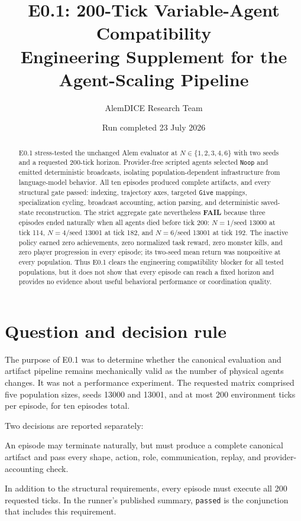 \documentclass[11pt]{article}
\title{\textbf{E0.1: 200-Tick Variable-Agent Compatibility}\\
\large Engineering Supplement for the Agent-Scaling Pipeline}
\author{AlemDICE Research Team}
\date{Run completed 23 July 2026}
\newcommand{\fail}{\textcolor{failred}{\textbf{FAIL}}}
\newcommand{\code}[1]{\texttt{#1}}
\begin{document}
\maketitle

\begin{abstract}
E0.1 stress-tested the unchanged Alem evaluator at
$N\in\{1,2,3,4,6\}$ with two seeds and a requested 200-tick horizon.
Provider-free scripted agents selected \code{Noop} and emitted deterministic
broadcasts, isolating population-dependent infrastructure from language-model
behavior.  All ten episodes produced complete artifacts, and every structural
gate passed: indexing, trajectory axes, targeted \code{Give} mappings,
specialization cycling, broadcast accounting, action parsing, and deterministic
saved-state reconstruction.  The strict aggregate gate nevertheless
\fail{} because three episodes ended naturally when all agents died before
tick 200: $N=1$/seed 13000 at tick 114, $N=4$/seed 13001 at tick 182, and
$N=6$/seed 13001 at tick 192.  The inactive policy earned zero achievements,
zero normalized task reward, zero monster kills, and zero player progression
in every episode; its two-seed mean return was nonpositive at every population.
Thus E0.1 clears the engineering compatibility blocker for all tested
populations, but it does not show that every episode can reach a fixed horizon
and provides no evidence about useful behavioral performance or coordination
quality.
\end{abstract}

\section{Question and decision rule}

The purpose of E0.1 was to determine whether the canonical evaluation and
artifact pipeline remains mechanically valid as the number of physical agents
changes.  It was not a performance experiment.  The requested matrix comprised
five population sizes, seeds 13000 and 13001, and at most 200 environment ticks
per episode, for ten episodes total.

Two decisions are reported separately:

\begin{description}[style=nextline,leftmargin=1.5em]
  \item[Structural gate.]
  An episode may terminate naturally, but must produce a complete canonical
  artifact and pass every shape, action, role, communication, replay, and
  provider-accounting check.
  \item[Strict horizon gate.]
  In addition to the structural requirements, every episode must execute all
  200 requested ticks.  In the runner's published summary,
  \code{passed} is the conjunction that includes this requirement.
\end{description}
\end{document}
